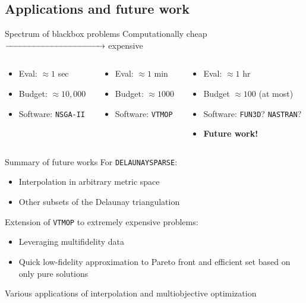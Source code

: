 \documentclass[xcolor=dvipsnames]{beamer}
\begin{document}
\subsection{Applications and future work}
\begin{frame}{Spectrum of blackbox problems}
Computationally cheap $\xrightarrow{\hspace*{4cm}}$ expensive
\bigskip
\begin{columns}
\begin{column}{.33\textwidth}
\begin{itemize}
\item Eval: $\approx 1$ sec
\item Budget: $\approx 10,000$
\item Software: {\tt NSGA-II}
\end{itemize}
\end{column}
\begin{column}{.33\textwidth}
\begin{itemize}
\item Eval: $\approx 1$ min
\item Budget: $\approx 1000$
\item Software: {\tt VTMOP}
\end{itemize}
\end{column}
\begin{column}{.33\textwidth}
\begin{itemize}
\item Eval: $\approx 1$ hr
\item Budget $\approx 100$ (at most)
\item Software: {\tt FUN3D}? {\tt NASTRAN}?
\pause
\item {\bf Future work!}
\end{itemize}
\end{column}
\end{columns}
\end{frame}
\begin{frame}{Summary of future works}
For {\tt DELAUNAYSPARSE}:
\begin{itemize}
\item Interpolation in arbitrary metric space
\item Other subsets of the Delaunay triangulation
\end{itemize}
\bigskip
Extension of {\tt VTMOP} to extremely expensive problems:
\begin{itemize}
\item Leveraging multifidelity data
\item Quick low-fidelity approximation to Pareto front and efficient set
based on only pure solutions
\end{itemize}
\bigskip
Various applications of interpolation and multiobjective optimization
\end{frame}
\end{document}
